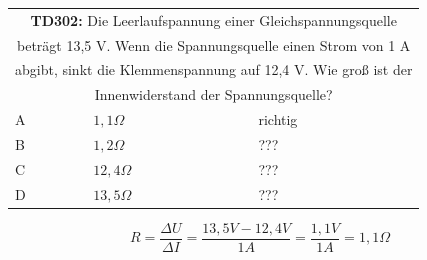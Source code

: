 \begin{frame}
	\begin{small}	
	\begin{tabular}{|l|l|l|}
	\hline
		\multicolumn{3}{|c|}{\textbf{TD302:} Die Leerlaufspannung einer Gleichspannungsquelle}\\
		\multicolumn{3}{|c|}{beträgt 13,5 V. Wenn die Spannungsquelle einen Strom von 1 A}\\
		\multicolumn{3}{|c|}{abgibt, sinkt die Klemmenspannung auf 12,4 V. Wie groß ist der}\\			\multicolumn{3}{|c|}{Innenwiderstand der Spannungsquelle?}\\
		\hline
		A & $1,1 \Omega$ & richtig \\ \hline
		B & $1,2 \Omega$ & ??? \\ \hline
		C & $12,4 \Omega$ & ??? \\ \hline
		D & $13,5 \Omega$ & ??? \\ \hline 		
	\end{tabular}
	\end{small}
	\vspace{1cm}
	\begin{equation}
		R = \frac{\Delta U}{\Delta I} = \frac{13,5V - 12,4V}{1A} = \frac{1,1V}{1A} = 1,1\Omega
	\end{equation}
\end{frame}

